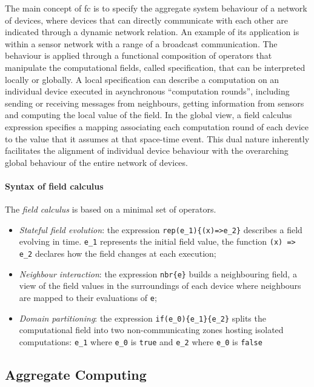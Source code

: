 The main concept of \ac{fc} is to specify the aggregate system behaviour of a network of devices, where devices that can
directly communicate with each other are indicated through a dynamic network relation.
An example of its application is within a sensor network with a range of a broadcast communication.
The behaviour is applied through a functional composition of operators that manipulate the computational fields,
called specification, that can be interpreted locally or globally.
A local specification can describe a computation on an individual device executed in asynchronous ``computation rounds'',
including sending or receiving messages from neighbours, getting information from sensors and computing the local value of the field.
In the global view, a field calculus expression specifies a mapping associating each computation round of each device to
the value that it assumes at that space-time event.
This dual nature inherently facilitates the alignment of individual device behaviour with the overarching global behaviour
of the entire network of devices.

\paragraph{Syntax of field calculus}
The \emph{field calculus} is based on a minimal set of operators.
\begin{itemize}
    \item \emph{Stateful field evolution}: the expression \lstinline|rep(e_1){(x)=>e_2}| describes a field evolving in time.
        \lstinline{e_1} represents the initial field value, the function \lstinline|(x) => e_2| declares how the field changes
        at each execution;
    \item \emph{Neighbour interaction}: the expression \lstinline|nbr{e}| builds a neighbouring field, a view of the field
        values in the surroundings of each device where neighbours are mapped to their evaluations of \texttt{e};
    \item \emph{Domain partitioning}: the expression \lstinline|if(e_0){e_1}{e_2}| splits the computational field into
        two non-communicating zones hosting isolated computations: \lstinline|e_1| where \lstinline|e_0| is \texttt{true} and
        \lstinline{e_2} where \lstinline{e_0} is \texttt{false} %
\end{itemize}

\subsection{Aggregate Computing}
\label{subsec:aggregate-computing}

